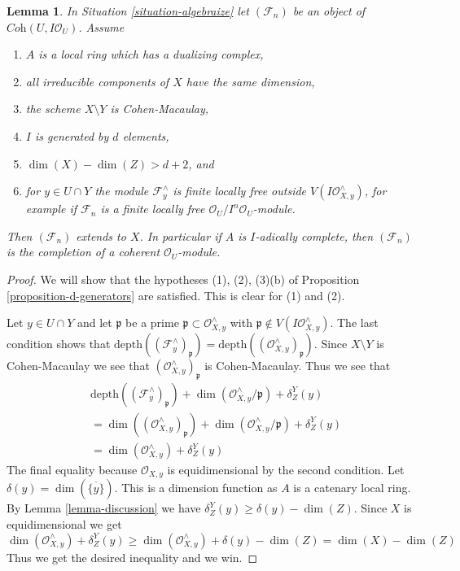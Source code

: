 \documentclass{stacks-project}
\theoremstyle{plain}
\newtheorem{lemma}[subsection]{Lemma}
\theoremstyle{definition}
\theoremstyle{remark}
\numberwithin{equation}{subsection}
\begin{document}
\begin{lemma}
\label{lemma-interesting-case-final}
In Situation \ref{situation-algebraize} let $(\mathcal{F}_n)$
be an object of $\textit{Coh}(U, I\mathcal{O}_U)$. Assume
\begin{enumerate}
\item $A$ is a local ring which has a dualizing complex,
\item all irreducible components of $X$ have the same dimension,
\item the scheme $X \setminus Y$ is Cohen-Macaulay,
\item $I$ is generated by $d$ elements,
\item $\dim(X) - \dim(Z) > d + 2$, and
\item for $y \in U \cap Y$ the module $\mathcal{F}_y^\wedge$
is finite locally free outside $V(I\mathcal{O}_{X, y}^\wedge)$,
for example if $\mathcal{F}_n$ is a finite locally free
$\mathcal{O}_U/I^n\mathcal{O}_U$-module.
\end{enumerate}
Then $(\mathcal{F}_n)$ extends to $X$. In particular if $A$ is $I$-adically
complete, then $(\mathcal{F}_n)$ is the completion of a coherent
$\mathcal{O}_U$-module.
\end{lemma}

\begin{proof}
We will show that the hypotheses (1), (2), (3)(b) of
Proposition \ref{proposition-d-generators} are satisfied.
This is clear for (1) and (2).

\medskip\noindent
Let $y \in U \cap Y$ and let $\mathfrak p$ be a prime
$\mathfrak p \subset \mathcal{O}_{X, y}^\wedge$ with
$\mathfrak p \not \in V(I\mathcal{O}_{X, y}^\wedge)$.
The last condition shows that
$\text{depth}((\mathcal{F}_y^\wedge)_\mathfrak p) =
\text{depth}((\mathcal{O}_{X, y}^\wedge)_\mathfrak p)$.
Since $X \setminus Y$ is Cohen-Macaulay we see that
$(\mathcal{O}_{X, y}^\wedge)_\mathfrak p$ is Cohen-Macaulay.
Thus we see that
\begin{align*}
& \text{depth}((\mathcal{F}^\wedge_y)_\mathfrak p) +
\dim(\mathcal{O}_{X, y}^\wedge/\mathfrak p) + \delta^Y_Z(y) \\
& =
\dim((\mathcal{O}_{X, y}^\wedge)_\mathfrak p) +
\dim(\mathcal{O}_{X, y}^\wedge/\mathfrak p) + \delta^Y_Z(y) \\
& =
\dim(\mathcal{O}_{X, y}^\wedge) + \delta^Y_Z(y)
\end{align*}
The final equality because $\mathcal{O}_{X, y}$ is equidimensional
by the second condition.
Let $\delta(y) = \dim(\overline{\{y\}})$. This is a dimension function
as $A$ is a catenary local ring.
By Lemma \ref{lemma-discussion}
we have $\delta^Y_Z(y) \geq \delta(y) - \dim(Z)$. Since $X$ is
equidimensional we get
$$
\dim(\mathcal{O}_{X, y}^\wedge) + \delta^Y_Z(y)
\geq \dim(\mathcal{O}_{X, y}^\wedge) + \delta(y) - \dim(Z)
= \dim(X) - \dim(Z)
$$
Thus we get the desired inequality and we win.
\end{proof}
\end{document}

